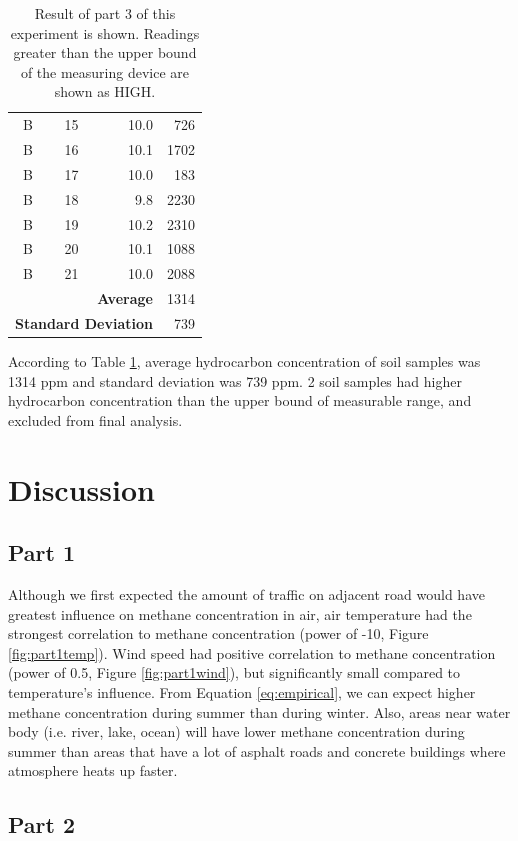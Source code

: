 \documentclass{article}
\begin{document}
\begin{table}[h!]
\begin{center}
\begin{tabular}{c|c|rr}
			B & 15 & 10.0 & 726 \\
			B & 16 & 10.1 & 1702 \\
			B & 17 & 10.0 & 183 \\
			B & 18 & 9.8 & 2230 \\
			B & 19 & 10.2 & 2310 \\
			B & 20 & 10.1 & 1088 \\
			B & 21 & 10.0 & 2088 \\ \hline \hline
			\multicolumn{3}{r}{\textbf{Average}} & 1314 \\
			\multicolumn{3}{r}{\textbf{Standard Deviation}} & 739 \\
		\end{tabular}
		\caption[Part 3 Result]{Result of part 3 of this experiment is shown. Readings greater than the upper bound of the measuring device are shown as HIGH.}
		\label{tab:part3}
	\end{center}
\end{table}

According to Table \ref{tab:part3}, average hydrocarbon concentration of soil samples was 1314 ppm and standard deviation was 739 ppm. 2 soil samples had higher hydrocarbon concentration than the upper bound of measurable range, and excluded from final analysis.

\section{Discussion}\label{sec:discussion}
\subsection{Part 1}

Although we first expected the amount of traffic on adjacent road would have greatest influence on methane concentration in air, air temperature had the strongest correlation to methane concentration (power of -10, Figure \ref{fig:part1temp}). Wind speed had positive correlation to methane concentration (power of 0.5, Figure \ref{fig:part1wind}), but significantly small compared to temperature's influence. From Equation \ref{eq:empirical}, we can expect higher methane concentration during summer than during winter. Also, areas near water body (i.e. river, lake, ocean) will have lower methane concentration during summer than areas that have a lot of asphalt roads and concrete buildings where atmosphere heats up faster.

\subsection{Part 2}
\end{document}
